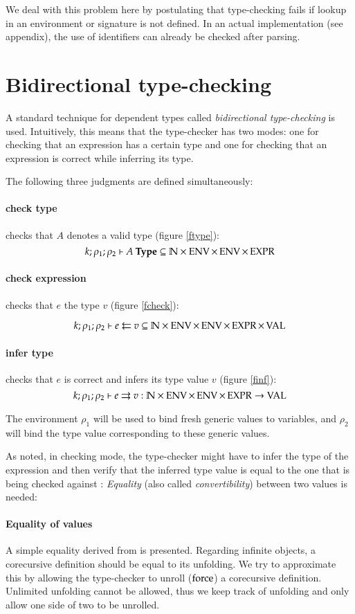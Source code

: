 We deal with this problem here by postulating that type-checking fails if lookup in an environment or signature is not defined.
In an actual implementation (see appendix), the use of identifiers can already be checked after parsing. 

\section{Bidirectional type-checking} 
A standard technique for dependent types called \emph{bidirectional type-checking} is used.
Intuitively, this means that the type-checker has two modes:
one for checking that an expression has a certain type and one for checking that an expression is correct while inferring its type.

\noindent The following three judgments are defined simultaneously:
\paragraph*{check type} checks that $A$ denotes a valid type (figure \ref{ftype}): 
\[k;\rho_1;\rho_2\vdash A\:\mathbf{Type} \subseteq \mathbb{N} \times \operatorname{ENV} \times \operatorname{ENV} \times \operatorname{EXPR} \]

\paragraph*{check expression} checks that $e$ the type $v$ (figure \ref{fcheck}):

\[k;\rho_1;\rho_2\vdash e\leftleftarrows v \subseteq \mathbb{N} \times \operatorname{ENV} \times \operatorname{ENV} \times \operatorname{EXPR} \times \operatorname{VAL}\]

\paragraph*{infer type} checks that $e$ is correct and infers its type value $v$ (figure \ref{finf}):
\[k;\rho_1;\rho_2\vdash e\rightrightarrows v : \mathbb{N} \times \operatorname{ENV} \times \operatorname{ENV} \times \operatorname{EXPR} \rightarrow \operatorname{VAL}\]


The environment $\rho_1$ will be used to bind fresh generic values to variables, and $\rho_2$ will bind the type value corresponding to these generic values.

As noted, in checking mode, the type-checker might have to infer the type of the expression and then verify that the inferred type value is equal to the one that is being checked against : \emph{Equality} (also called \emph{convertibility}) between two values is needed:

\paragraph*{Equality of values}
A simple equality derived from \cite{coquand96algorithm} is presented. 
Regarding infinite objects, a corecursive definition should be equal to its unfolding.
We try to approximate this by allowing the type-checker to unroll ($\operatorname{force}$) a corecursive definition. Unlimited unfolding cannot be allowed, thus we keep track of unfolding and only allow one side of two to be unrolled.


